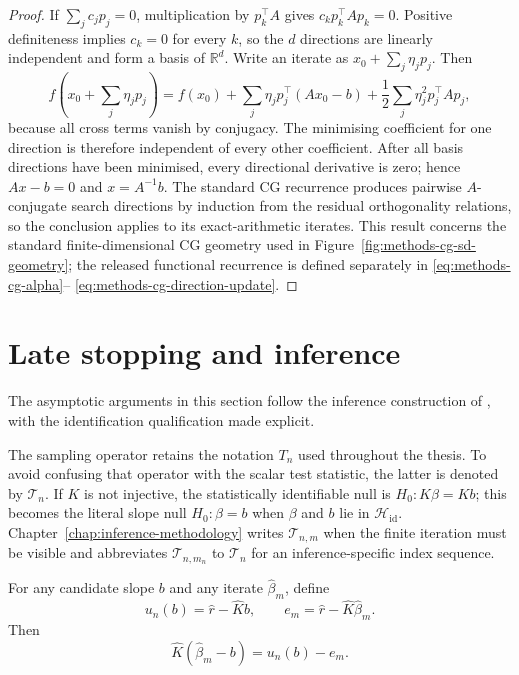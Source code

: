 \begin{proof}
If $\sum_jc_jp_j=0$, multiplication by $p_k^\top A$ gives
$c_kp_k^\top Ap_k=0$.  Positive definiteness implies $c_k=0$ for every $k$,
so the $d$ directions are linearly independent and form a basis of
$\mathbb R^d$.  Write an iterate as
$x_0+\sum_j\eta_jp_j$.  Then
\[
 f\!\left(x_0+\sum_j\eta_jp_j\right)
 =f(x_0)+\sum_j\eta_jp_j^\top(Ax_0-b)
  +\frac12\sum_j\eta_j^2p_j^\top Ap_j,
\]
because all cross terms vanish by conjugacy.  The minimising coefficient for
one direction is therefore independent of every other coefficient.  After
all basis directions have been minimised, every directional derivative is
zero; hence $Ax-b=0$ and $x=A^{-1}b$.  The standard CG recurrence produces
pairwise $A$-conjugate search directions by induction from the residual
orthogonality relations, so the conclusion applies to its exact-arithmetic
iterates.  This result concerns the standard finite-dimensional CG geometry
used in Figure~\ref{fig:methods-cg-sd-geometry}; the released functional
recurrence is defined separately in \eqref{eq:methods-cg-alpha}--
\eqref{eq:methods-cg-direction-update}.
\end{proof}

\section{Late stopping and inference}
\label{sec:app-inference-proofs}

The asymptotic arguments in this section follow the inference construction of
\textcite{babii_carrasco_tsafack_2026}, with the identification qualification
made explicit.

The sampling operator retains the notation $T_n$ used throughout the
thesis.  To avoid confusing that operator with the scalar test statistic,
the latter is denoted by $\mathcal T_n$.  If $K$ is not injective, the
statistically identifiable null is $H_0:K\beta=Kb$; this becomes the literal
slope null $H_0:\beta=b$ when $\beta$ and $b$ lie in
$\mathcal H_{\mathrm{id}}$.  Chapter~\ref{chap:inference-methodology} writes
$\mathcal T_{n,m}$ when the finite iteration must be visible and abbreviates
$\mathcal T_{n,m_n}$ to $\mathcal T_n$ for an inference-specific index
sequence.

\begin{proposition}
\label{prop:app-inference-decomposition}
For any candidate slope $b$ and any iterate $\widehat\beta_m$, define
\[
 u_n(b)=\widehat r-\widehat Kb,
 \qquad
 e_m=\widehat r-\widehat K\widehat\beta_m.
\]
Then
\[
 \widehat K(\widehat\beta_m-b)=u_n(b)-e_m.
\]
\end{proposition}

